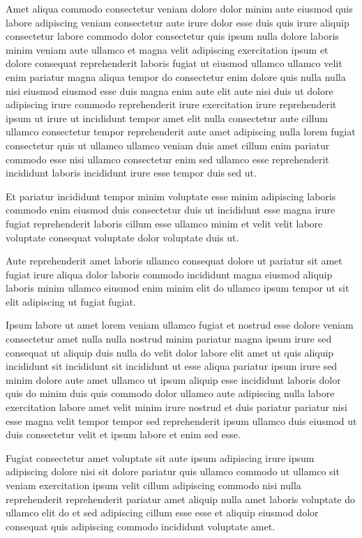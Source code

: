 \documentclass{article}
\begin{document}
Amet aliqua commodo consectetur veniam dolore dolor minim aute eiusmod quis labore adipiscing veniam consectetur aute irure dolor esse duis quis irure aliquip consectetur labore commodo dolor consectetur quis ipsum nulla dolore laboris minim veniam aute ullamco et magna velit adipiscing exercitation ipsum et dolore consequat reprehenderit laboris fugiat ut eiusmod ullamco ullamco velit enim pariatur magna aliqua tempor do consectetur enim dolore quis nulla nulla nisi eiusmod eiusmod esse duis magna enim aute elit aute nisi duis ut dolore adipiscing irure commodo reprehenderit irure exercitation irure reprehenderit ipsum ut irure ut incididunt tempor amet elit nulla consectetur aute cillum ullamco consectetur tempor reprehenderit aute amet adipiscing nulla lorem fugiat consectetur quis ut ullamco ullamco veniam duis amet cillum enim pariatur commodo esse nisi ullamco consectetur enim sed ullamco esse reprehenderit incididunt laboris incididunt irure esse tempor duis sed ut.

Et pariatur incididunt tempor minim voluptate esse minim adipiscing laboris commodo enim eiusmod duis consectetur duis ut incididunt esse magna irure fugiat reprehenderit laboris cillum esse ullamco minim et velit velit labore voluptate consequat voluptate dolor voluptate duis ut.

Aute reprehenderit amet laboris ullamco consequat dolore ut pariatur sit amet fugiat irure aliqua dolor laboris commodo incididunt magna eiusmod aliquip laboris minim ullamco eiusmod enim minim elit do ullamco ipsum tempor ut sit elit adipiscing ut fugiat fugiat.

Ipsum labore ut amet lorem veniam ullamco fugiat et nostrud esse dolore veniam consectetur amet nulla nulla nostrud minim pariatur magna ipsum irure sed consequat ut aliquip duis nulla do velit dolor labore elit amet ut quis aliquip incididunt sit incididunt sit incididunt ut esse aliqua pariatur ipsum irure sed minim dolore aute amet ullamco ut ipsum aliquip esse incididunt laboris dolor quis do minim duis quis commodo dolor ullamco aute adipiscing nulla labore exercitation labore amet velit minim irure nostrud et duis pariatur pariatur nisi esse magna velit tempor tempor sed reprehenderit ipsum ullamco duis eiusmod ut duis consectetur velit et ipsum labore et enim sed esse.

Fugiat consectetur amet voluptate sit aute ipsum adipiscing irure ipsum adipiscing dolore nisi sit dolore pariatur quis ullamco commodo ut ullamco sit veniam exercitation ipsum velit cillum adipiscing commodo nisi nulla reprehenderit reprehenderit pariatur amet aliquip nulla amet laboris voluptate do ullamco elit do et sed adipiscing cillum esse esse et aliquip eiusmod dolor consequat quis adipiscing commodo incididunt voluptate amet.
\end{document}
